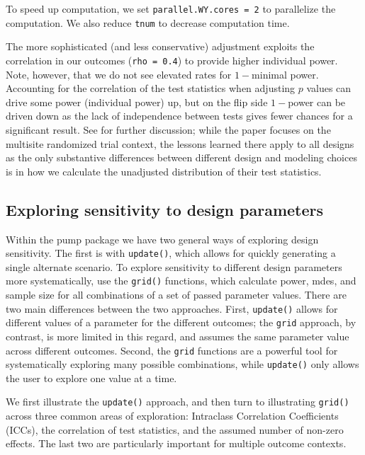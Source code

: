 \documentclass[
]{jss}
\begin{document}
To speed up computation, we set \texttt{parallel.WY.cores\ =\ 2} to
parallelize the computation. We also reduce \texttt{tnum} to decrease
computation time.

The more sophisticated (and less conservative) adjustment exploits the
correlation in our outcomes (\texttt{rho\ =\ 0.4}) to provide higher
individual power. Note, however, that we do not see elevated rates for
\(1-\)minimal power. Accounting for the correlation of the test
statistics when adjusting \(p\) values can drive some power (individual
power) up, but on the flip side \(1-\)power can be driven down as the
lack of independence between tests gives fewer chances for a significant
result. See \citet{Porter2018} for further discussion; while the paper
focuses on the multisite randomized trial context, the lessons learned
there apply to all designs as the only substantive differences between
different design and modeling choices is in how we calculate the
unadjusted distribution of their test statistics.

\subsection{Exploring sensitivity to design parameters}

Within the pump package we have two general ways of exploring design
sensitivity. The first is with \texttt{update()}, which allows for
quickly generating a single alternate scenario. To explore sensitivity
to different design parameters more systematically, use the
\texttt{grid()} functions, which calculate power, mdes, and sample size
for all combinations of a set of passed parameter values. There are two
main differences between the two approaches. First, \texttt{update()}
allows for different values of a parameter for the different outcomes;
the \texttt{grid} approach, by contrast, is more limited in this regard,
and assumes the same parameter value across different outcomes. Second,
the \texttt{grid} functions are a powerful tool for systematically
exploring many possible combinations, while \texttt{update()} only
allows the user to explore one value at a time.

We first illustrate the \texttt{update()} approach, and then turn to
illustrating \texttt{grid()} across three common areas of exploration:
Intraclass Correlation Coefficients (ICCs), the correlation of test
statistics, and the assumed number of non-zero effects. The last two are
particularly important for multiple outcome contexts.
\end{document}
